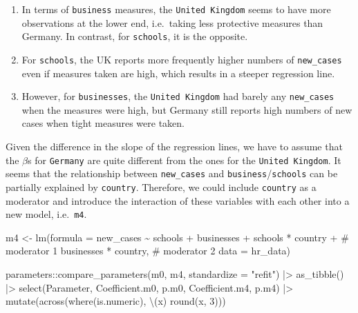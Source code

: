 \documentclass[
  letterpaper,
  DIV=11,
  numbers=noendperiod]{scrreprt}
\newenvironment{Shaded}{\begin{snugshade}}{\end{snugshade}}
\newcommand{\AttributeTok}[1]{\textcolor[rgb]{0.40,0.45,0.13}{#1}}
\newcommand{\CommentTok}[1]{\textcolor[rgb]{0.37,0.37,0.37}{#1}}
\newcommand{\DecValTok}[1]{\textcolor[rgb]{0.68,0.00,0.00}{#1}}
\newcommand{\FunctionTok}[1]{\textcolor[rgb]{0.28,0.35,0.67}{#1}}
\newcommand{\NormalTok}[1]{\textcolor[rgb]{0.00,0.23,0.31}{#1}}
\newcommand{\OtherTok}[1]{\textcolor[rgb]{0.00,0.23,0.31}{#1}}
\newcommand{\SpecialCharTok}[1]{\textcolor[rgb]{0.37,0.37,0.37}{#1}}
\newcommand{\StringTok}[1]{\textcolor[rgb]{0.13,0.47,0.30}{#1}}
\providecommand{\tightlist}{%
  \setlength{\itemsep}{0pt}\setlength{\parskip}{0pt}}\usepackage{longtable,booktabs,array}
\begin{document}
\begin{enumerate}
\def\labelenumi{\arabic{enumi}.}
\tightlist
\item
  In terms of \texttt{business} measures, the \texttt{United\ Kingdom}
  seems to have more observations at the lower end, i.e.~taking less
  protective measures than Germany. In contrast, for \texttt{schools},
  it is the opposite.
\item
  For \texttt{schools}, the UK reports more frequently higher numbers of
  \texttt{new\_cases} even if measures taken are high, which results in
  a steeper regression line.
\item
  However, for \texttt{businesses}, the \texttt{United\ Kingdom} had
  barely any \texttt{new\_cases} when the measures were high, but
  Germany still reports high numbers of new cases when tight measures
  were taken.
\end{enumerate}

Given the difference in the slope of the regression lines, we have to
assume that the \(\beta\)s for \texttt{Germany} are quite different from
the ones for the \texttt{United\ Kingdom}. It seems that the
relationship between \texttt{new\_cases} and
\texttt{business}/\texttt{schools} can be partially explained by
\texttt{country}. Therefore, we could include \texttt{country} as a
moderator and introduce the interaction of these variables with each
other into a new model, i.e.~\texttt{m4}.

\begin{Shaded}
\begin{Highlighting}[]
\NormalTok{m4 }\OtherTok{\textless{}{-}} \FunctionTok{lm}\NormalTok{(}\AttributeTok{formula =}\NormalTok{ new\_cases }\SpecialCharTok{\textasciitilde{}}
\NormalTok{           schools }\SpecialCharTok{+}
\NormalTok{           businesses }\SpecialCharTok{+}
\NormalTok{           schools }\SpecialCharTok{*}\NormalTok{ country }\SpecialCharTok{+}  \CommentTok{\# moderator 1}
\NormalTok{           businesses }\SpecialCharTok{*}\NormalTok{ country, }\CommentTok{\# moderator 2}
         \AttributeTok{data =}\NormalTok{ hr\_data)}

\NormalTok{parameters}\SpecialCharTok{::}\FunctionTok{compare\_parameters}\NormalTok{(m0, m4, }\AttributeTok{standardize =} \StringTok{"refit"}\NormalTok{) }\SpecialCharTok{|\textgreater{}}
  \FunctionTok{as\_tibble}\NormalTok{() }\SpecialCharTok{|\textgreater{}}
  \FunctionTok{select}\NormalTok{(Parameter, Coefficient.m0, p.m0, Coefficient.m4, p.m4) }\SpecialCharTok{|\textgreater{}}
  \FunctionTok{mutate}\NormalTok{(}\FunctionTok{across}\NormalTok{(}\FunctionTok{where}\NormalTok{(is.numeric), \textbackslash{}(x) }\FunctionTok{round}\NormalTok{(x, }\DecValTok{3}\NormalTok{)))}
\end{Highlighting}
\end{Shaded}
\end{document}
